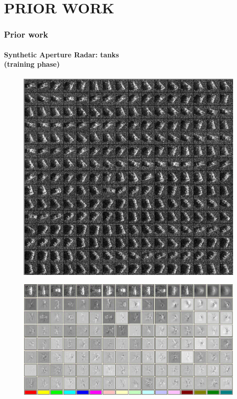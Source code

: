 \section{PRIOR WORK}
\begin{frame}
\frametitle{Prior work}
\framesubtitle{\small Synthetic Aperture Radar: tanks\\(training phase)}
\logoCSIPCPL\mypagenum
	\begin{figure}		
		\includegraphics[height=0.35\textheight]{figs/RVQ_SARtank_1_snippets.png}			
	\end{figure}
	\begin{figure}
		\includegraphics[height=0.45\textheight]{figs/RVQ_SARtank_2_codebooks.png}
	\end{figure}
\end{frame}



